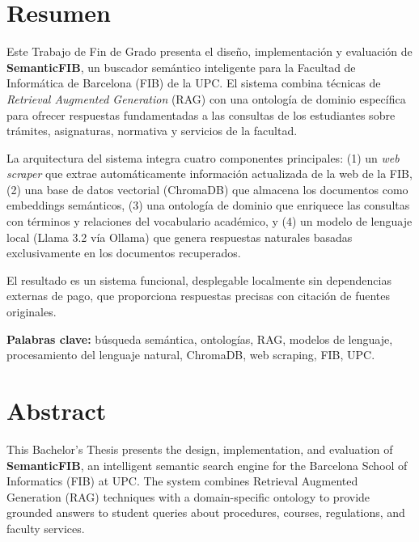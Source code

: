 \documentclass[12pt, a4paper, twoside]{report}
\begin{document}

\chapter*{Resumen}

Este Trabajo de Fin de Grado presenta el dise\~no, implementaci\'on y evaluaci\'on de \textbf{SemanticFIB}, un buscador sem\'antico inteligente para la Facultad de Inform\'atica de Barcelona (FIB) de la UPC. El sistema combina t\'ecnicas de \textit{Retrieval Augmented Generation} (RAG) con una ontolog\'ia de dominio espec\'ifica para ofrecer respuestas fundamentadas a las consultas de los estudiantes sobre tr\'amites, asignaturas, normativa y servicios de la facultad.

La arquitectura del sistema integra cuatro componentes principales: (1) un \textit{web scraper} que extrae autom\'aticamente informaci\'on actualizada de la web de la FIB, (2) una base de datos vectorial (ChromaDB) que almacena los documentos como embeddings sem\'anticos, (3) una ontolog\'ia de dominio que enriquece las consultas con t\'erminos y relaciones del vocabulario acad\'emico, y (4) un modelo de lenguaje local (Llama 3.2 v\'ia Ollama) que genera respuestas naturales basadas exclusivamente en los documentos recuperados.

El resultado es un sistema funcional, desplegable localmente sin dependencias externas de pago, que proporciona respuestas precisas con citaci\'on de fuentes originales.

\textbf{Palabras clave:} b\'usqueda sem\'antica, ontolog\'ias, RAG, modelos de lenguaje, procesamiento del lenguaje natural, ChromaDB, web scraping, FIB, UPC.

\vspace{1cm}

\chapter*{Abstract}

This Bachelor's Thesis presents the design, implementation, and evaluation of \textbf{SemanticFIB}, an intelligent semantic search engine for the Barcelona School of Informatics (FIB) at UPC. The system combines Retrieval Augmented Generation (RAG) techniques with a domain-specific ontology to provide grounded answers to student queries about procedures, courses, regulations, and faculty services.
\end{document}
